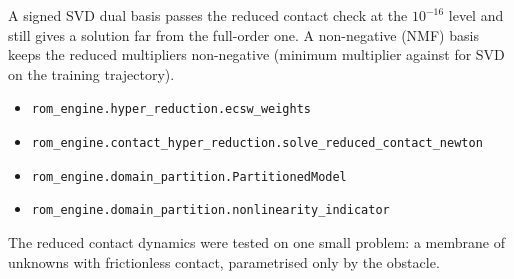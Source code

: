 \newpage\thispagestyle{hl}
\par
{}
\begin{hlheadline}A signed SVD dual basis passes the reduced contact check at the $10^{-16}$ level and still gives a solution far from the full-order one. A non-negative (NMF) basis keeps the reduced multipliers non-negative (minimum multiplier \chdNmfTenTrMinLam{} against \chdSvdTenTrMinLam{} for SVD on the training trajectory).\end{hlheadline}
{\begin{itemize}\setlength\itemsep{2pt}
\item \texttt{rom\_engine.hyper\_reduction.ecsw\_weights}
\item \texttt{rom\_engine.contact\_hyper\_reduction.solve\_reduced\_contact\_newton}
\item \texttt{rom\_engine.domain\_partition.PartitionedModel}
\item \texttt{rom\_engine.domain\_partition.nonlinearity\_indicator}
\end{itemize}}
\begin{hllimit}The reduced contact dynamics were tested on one small problem: a membrane of \chdN{} unknowns with frictionless contact, parametrised only by the obstacle.\end{hllimit}
